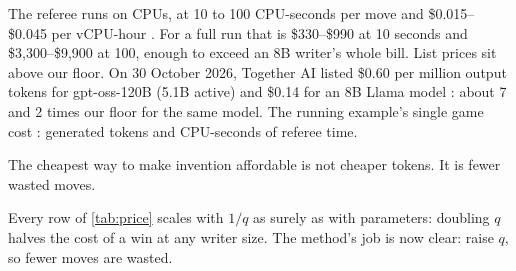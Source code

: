 The referee runs on CPUs, at 10 to 100 CPU-seconds per move and
\$0.015--\$0.045 per vCPU-hour \citep{doit2026c7i}. For a full run that is
\$330--\$990 at 10 seconds and \$3,300--\$9,900 at 100, enough to exceed an
8B writer's whole bill. List prices sit above our floor. On 30 October 2026,
Together AI listed \$0.60 per million output tokens for gpt-oss-120B (5.1B
active) and \$0.14 for an 8B Llama model
\citep{together2026pricing,openai2025gptoss}: about 7 and 2 times our floor
for the same model. The running example's single game cost :
 generated tokens and  CPU-seconds of referee time.

\begin{keyidea}
  The cheapest way to make invention affordable is not cheaper tokens.
  It is fewer wasted moves.
\end{keyidea}

Every row of \cref{tab:price} scales with $1/q$ as surely as with
parameters: doubling $q$ halves the cost of a win at any writer size. The
method's job is now clear: raise $q$, so fewer moves are wasted.
